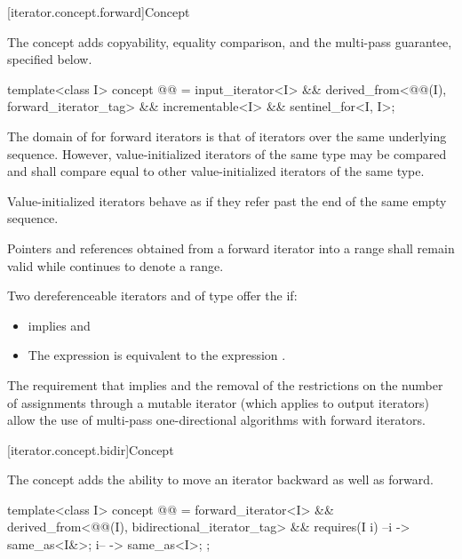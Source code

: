 [iterator.concept.forward]{Concept }

\pnum
The  concept adds
copyability, equality comparison, and
the multi-pass guarantee, specified below.

\begin{codeblock}
template<class I>
  concept @@ =
    input_iterator<I> &&
    derived_from<@@(I), forward_iterator_tag> &&
    incrementable<I> &&
    sentinel_for<I, I>;
\end{codeblock}

\pnum
The domain of \tcode{==} for forward iterators is that of iterators over the same
underlying sequence. However, value-initialized iterators of the same type
may be compared and shall compare equal to other value-initialized iterators of the same type.
\begin{note}
Value-initialized iterators behave as if they refer past the end of the same
empty sequence.
\end{note}

\pnum
Pointers and references obtained from a forward iterator into a range 
shall remain valid while  continues to denote a range.

\pnum
Two dereferenceable iterators  and  of type 
offer the  if:
\begin{itemize}
\item {} implies  and
\item The expression
 is equivalent to the expression .
\end{itemize}

\pnum
\begin{note}
The requirement that
implies
and the removal of the restrictions on the number of assignments through
a mutable iterator
(which applies to output iterators)
allow the use of multi-pass one-directional algorithms with forward iterators.
\end{note}

[iterator.concept.bidir]{Concept }

\pnum
The  concept adds the ability
to move an iterator backward as well as forward.

\begin{codeblock}
template<class I>
  concept @@ =
    forward_iterator<I> &&
    derived_from<@@(I), bidirectional_iterator_tag> &&
    requires(I i) {
      { --i } -> same_as<I&>;
      { i-- } -> same_as<I>;
    };
\end{codeblock}

